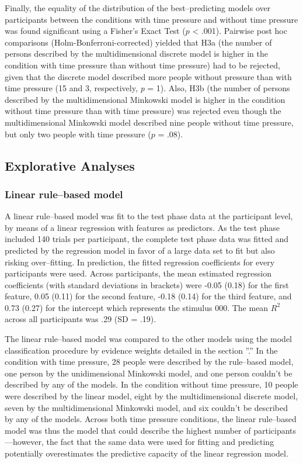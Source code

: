 \documentclass[a4paper,man,natbib]{apa6}
\begin{document}
Finally, the equality of the distribution of the best--predicting models over participants between the conditions with time pressure and without time pressure was found significant using a Fisher's Exact Test ($p$ < .001). Pairwise post hoc comparisons (Holm-Bonferroni-corrected) yielded that H3a (the number of persons described by the multidimensional discrete model is higher in the condition with time pressure than without time pressure) had to be rejected, given that the discrete model described more people without pressure than with time pressure (15 and 3, respectively, \textit{p} = 1). Also, H3b (the number of persons described by the multidimensional Minkowski model is higher in the condition without time pressure than with time pressure) was rejected even though the multidimensional Minkowski model described nine people without time pressure, but only two people with time pressure ($p$ = .08).

\subsection{Explorative Analyses}

\subsubsection{Linear rule--based model}
A linear rule--based model was fit to the test phase data at the participant level, by means of a linear regression with features as predictors. As the test phase included 140 trials per participant, the complete test phase data was fitted and predicted by the regression model in favor of a large data set to fit but also risking over--fitting. In prediction, the fitted regression coefficients for every participants were used. Across participants, the mean estimated regression coefficients (with standard deviations in brackets) were -0.05 (0.18) for the first feature, 0.05 (0.11) for the second feature, -0.18 (0.14) for the third feature, and 0.73 (0.27) for the intercept which represents the stimulus 000. The mean $R^2$ across all participants was .29 (SD = .19).

The linear rule--based model was compared to the other models using the model classification procedure by evidence weights detailed in the section ''.'' In the condition with time pressure, 28 people were described by the rule--based model, one person by the unidimensional Minkowski model, and one person couldn't be described by any of the models. In the condition without time pressure, 10 people were described by the linear model, eight by the multidimensional discrete model, seven by the multidimensional Minkowski model, and six couldn't be described by any of the models. Across both time pressure conditions, the linear rule--based model was thus the model that could describe the highest number of participants---however, the fact that the same data were used for fitting and predicting potentially overestimates the predictive capacity of the linear regression model. 
\end{document}
